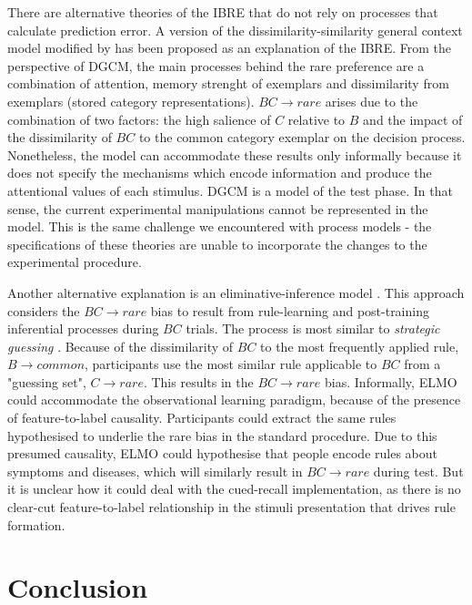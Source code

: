 \documentclass[10pt,letterpaper]{article}
\begin{document}
There are alternative theories of the IBRE that do not rely on processes that calculate prediction error.
A version of the dissimilarity-similarity general context model \cite<DGCM, >{stewart2007dissimilarity} modified by \cite{o2018model} has been proposed as an explanation of the IBRE.
From the perspective of DGCM, the main processes behind the rare preference are a combination of attention, memory strenght of exemplars and dissimilarity from exemplars (stored category representations).
$BC \to rare$ arises due to the combination of two factors: the high salience of $C$ relative to $B$ and the impact of the dissimilarity of $BC$ to the common category exemplar on the decision process.
Nonetheless, the model can accommodate these results only informally because it does not specify the mechanisms which encode information and produce the attentional values of each stimulus.
DGCM is a model of the test phase.
In that sense, the current experimental manipulations cannot be represented in the model.
This is the same challenge we encountered with process models - the specifications of these theories are unable to incorporate the changes to the experimental procedure.

Another alternative explanation is an eliminative-inference model \cite<ELMO, >{juslin2001high}.
This approach considers the $BC \to rare$ bias to result from rule-learning and post-training inferential processes during $BC$ trials.
The process is most similar to \textit{strategic guessing} \cite{kruschke1995extensions}.
Because of the dissimilarity of $BC$ to the most frequently applied rule, $B \to common$, participants use the most similar rule applicable to $BC$ from a "guessing set", $C \to rare$.
This results in the $BC \to rare$ bias.
Informally, ELMO could accommodate the observational learning paradigm, because of the presence of feature-to-label causality.
Participants could extract the same rules hypothesised to underlie the rare bias in the standard procedure.
Due to this presumed causality, ELMO could hypothesise that people encode rules about symptoms and diseases, which will similarly result in $BC \to rare$ during test.
But it is unclear how it could deal with the cued-recall implementation, as there is no clear-cut feature-to-label relationship in the stimuli presentation that drives rule formation.

\section{Conclusion}
\end{document}

